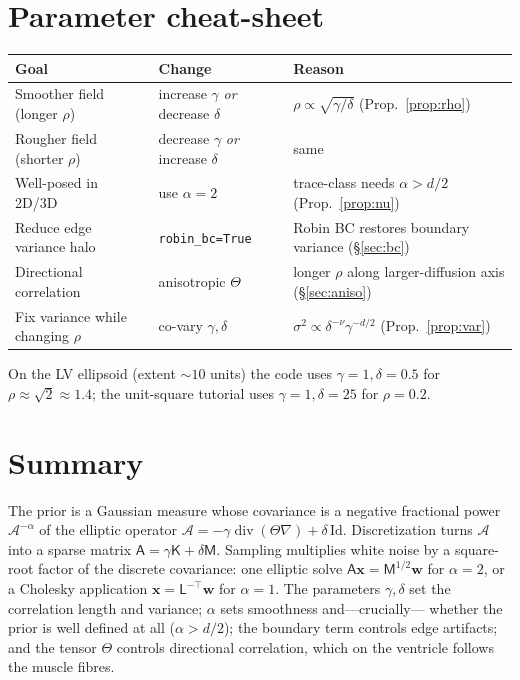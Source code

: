 \documentclass[11pt]{article}
\theoremstyle{definition}
\theoremstyle{plain}
\theoremstyle{remark}
\newcommand{\divg}{\operatorname{div}}
\newcommand{\grad}{\nabla}
\newcommand{\Ac}{\mathcal{A}}
\newcommand{\Mmat}{\mathsf{M}}
\newcommand{\Amat}{\mathsf{A}}
\newcommand{\Kmat}{\mathsf{K}}
\newcommand{\Lmat}{\mathsf{L}}
\newcommand{\bx}{\bm{x}}
\newcommand{\bw}{\bm{w}}
\begin{document}
\section{Parameter cheat-sheet}

\begin{center}
\begin{tabular}{lll}
\toprule
Goal & Change & Reason \\
\midrule
Smoother field (longer $\rho$) & increase $\gamma$ \emph{or} decrease $\delta$
  & $\rho\propto\sqrt{\gamma/\delta}$ (Prop.~\ref{prop:rho}) \\
Rougher field (shorter $\rho$) & decrease $\gamma$ \emph{or} increase $\delta$
  & same \\
Well-posed in 2D/3D & use $\alpha=2$
  & trace-class needs $\alpha>d/2$ (Prop.~\ref{prop:nu}) \\
Reduce edge variance halo & \texttt{robin\_bc=True}
  & Robin BC restores boundary variance (\S\ref{sec:bc}) \\
Directional correlation & anisotropic $\Theta$
  & longer $\rho$ along larger-diffusion axis (\S\ref{sec:aniso}) \\
Fix variance while changing $\rho$ & co-vary $\gamma,\delta$
  & $\sigma^2\propto\delta^{-\nu}\gamma^{-d/2}$ (Prop.~\ref{prop:var}) \\
\bottomrule
\end{tabular}
\end{center}

On the LV ellipsoid (extent $\sim 10$ units) the code uses $\gamma=1,\delta=0.5$
for $\rho\approx\sqrt{2}\approx1.4$; the unit-square tutorial uses
$\gamma=1,\delta=25$ for $\rho=0.2$.

\section*{Summary}

The prior is a Gaussian measure whose covariance is a negative fractional power
$\Ac^{-\alpha}$ of the elliptic operator
$\Ac=-\gamma\divg(\Theta\grad)+\delta\,\mathrm{Id}$. Discretization turns $\Ac$
into a sparse matrix $\Amat=\gamma\Kmat+\delta\Mmat$. Sampling multiplies white
noise by a square-root factor of the discrete covariance: one elliptic solve
$\Amat\bx=\Mmat^{1/2}\bw$ for $\alpha=2$, or a Cholesky application
$\bx=\Lmat^{-\top}\bw$ for $\alpha=1$. The parameters $\gamma,\delta$ set the
correlation length and variance; $\alpha$ sets smoothness and---crucially---
whether the prior is well defined at all ($\alpha>d/2$); the boundary term
controls edge artifacts; and the tensor $\Theta$ controls directional
correlation, which on the ventricle follows the muscle fibres.
\end{document}
